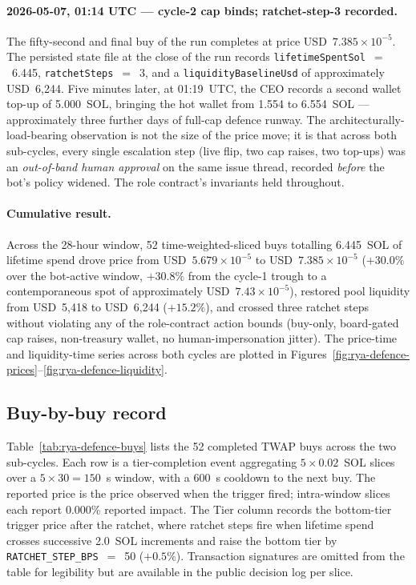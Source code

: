 \documentclass[11pt,a4paper]{article}
\begin{document}
\paragraph{2026-05-07, 01:14 UTC --- cycle-2 cap binds; ratchet-step-3
recorded.} The fifty-second and final buy of the run completes at price
USD~$7.385\!\times\!10^{-5}$. The persisted state file at the close of the run
records \texttt{lifetimeSpentSol}~$=$~6.445, \texttt{ratchetSteps}~$=$~3, and a
\texttt{liquidityBaselineUsd} of approximately USD~6{,}244. Five minutes later,
at 01:19~UTC, the CEO records a second wallet top-up of 5.000~SOL, bringing the
hot wallet from 1.554 to 6.554~SOL --- approximately three further days of
full-cap defence runway. The architecturally-load-bearing observation is not the
size of the price move; it is that across both sub-cycles, every single
escalation step (live flip, two cap raises, two top-ups) was an
\emph{out-of-band human approval} on the same issue thread, recorded
\emph{before} the bot's policy widened. The role contract's invariants held
throughout.

\paragraph{Cumulative result.} Across the 28-hour window, 52 time-weighted-sliced
buys totalling 6.445~SOL of lifetime spend drove price from
USD~$5.679\!\times\!10^{-5}$ to USD~$7.385\!\times\!10^{-5}$ ($+30.0\%$ over
the bot-active window, $+30.8\%$ from the cycle-1 trough to a contemporaneous
spot of approximately USD~$7.43\!\times\!10^{-5}$), restored pool liquidity
from USD~5{,}418 to USD~6{,}244 ($+15.2\%$), and crossed three ratchet steps
without violating any of the role-contract action bounds (buy-only, board-gated
cap raises, non-treasury wallet, no human-impersonation jitter). The price-time
and liquidity-time series across both cycles are plotted in
Figures~\ref{fig:rya-defence-prices}--\ref{fig:rya-defence-liquidity}.

\subsection{Buy-by-buy record}\label{sec:case-study:buys}

Table~\ref{tab:rya-defence-buys} lists the 52 completed TWAP buys across the two
sub-cycles. Each row is a tier-completion event aggregating $5 \times 0.02$~SOL
slices over a $5 \times 30 = 150$~s window, with a 600~s cooldown to the next
buy. The reported price is the price observed when the trigger fired; intra-window
slices each report 0.000\% reported impact. The Tier column records the
bottom-tier trigger price after the ratchet, where ratchet steps fire when
lifetime spend crosses successive 2.0~SOL increments and raise the bottom tier by
\texttt{RATCHET\_STEP\_BPS}~$=$~50 ($+0.5\%$). Transaction signatures are
omitted from the table for legibility but are available in the public decision
log per slice.
\end{document}
